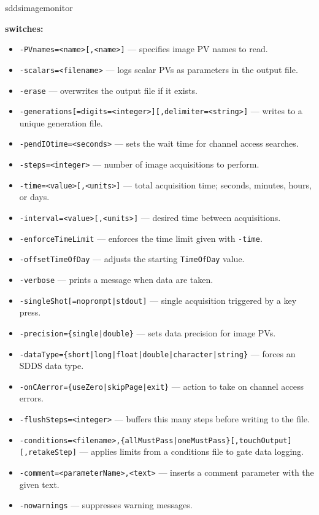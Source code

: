 \begin{sddsprog}{sddsimagemonitor}
\item \textbf{switches:}
\begin{itemize}
  \item {\verb+-PVnames=<name>[,<name>]+} --- specifies image PV names to read.
  \item {\verb+-scalars=<filename>+} --- logs scalar PVs as parameters in the output file.
  \item {\tt -erase} --- overwrites the output file if it exists.
  \item {\verb+-generations[=digits=<integer>][,delimiter=<string>]+} --- writes to a unique generation file.
  \item {\verb+-pendIOtime=<seconds>+} --- sets the wait time for channel access searches.
  \item {\verb+-steps=<integer>+} --- number of image acquisitions to perform.
  \item {\verb+-time=<value>[,<units>]+} --- total acquisition time; seconds, minutes, hours, or days.
  \item {\verb+-interval=<value>[,<units>]+} --- desired time between acquisitions.
  \item {\tt -enforceTimeLimit} --- enforces the time limit given with \verb+-time+.
  \item {\tt -offsetTimeOfDay} --- adjusts the starting \verb+TimeOfDay+ value.
  \item {\tt -verbose} --- prints a message when data are taken.
  \item {\verb+-singleShot[=noprompt|stdout]+} --- single acquisition triggered by a key press.
  \item {\verb+-precision={single|double}+} --- sets data precision for image PVs.
  \item {\verb+-dataType={short|long|float|double|character|string}+} --- forces an SDDS data type.
  \item {\verb+-onCAerror={useZero|skipPage|exit}+} --- action to take on channel access errors.
  \item {\verb+-flushSteps=<integer>+} --- buffers this many steps before writing to the file.
  \item {\verb+-conditions=<filename>,{allMustPass|oneMustPass}[,touchOutput][,retakeStep]+} ---
        applies limits from a conditions file to gate data logging.
  \item {\verb+-comment=<parameterName>,<text>+} --- inserts a comment parameter with the given text.
  \item {\tt -nowarnings} --- suppresses warning messages.

\end{itemize}
\end{sddsprog}

